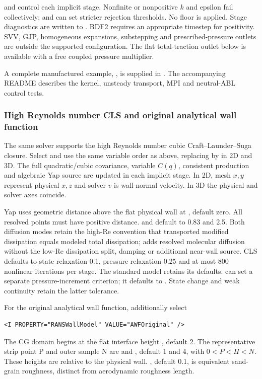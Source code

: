  and  control each
implicit stage. Nonfinite or nonpositive $k$ and epsilon fail collectively;
 and  can set stricter rejection
thresholds. No floor is applied. Stage diagnostics are written to
. BDF2 requires an appropriate timestep for positivity.
SVV, GJP, homogeneous expansions, substepping and prescribed-pressure outlets
are outside the supported configuration. The flat total-traction outlet below
is available with a free coupled pressure multiplier.

A complete manufactured example, , is supplied in
.
The accompanying README describes the kernel, unsteady transport, MPI and
neutral-ABL control tests.

\subsubsection{High Reynolds number CLS and original analytical wall function}
\label{CLSRANSScheme}

The same solver supports the high Reynolds number cubic Craft--Launder--Suga
closure. Select  and use the same variable
order as above, replacing  by  in 2D and 3D.
The full quadratic/cubic covariance, variable $C(q)$, consistent production
and algebraic Yap source are updated in each implicit stage. In 2D, mesh
$x,y$ represent physical $x,z$ and solver $v$ is wall-normal velocity.
In 3D the physical and solver axes coincide.

Yap uses geometric distance above the flat physical wall at
, default zero. All resolved points must have positive
distance.  and  default to
0.83 and 2.5. Both diffusion modes retain the high-Re convention that
transported modified dissipation equals modeled total dissipation;
 adds resolved molecular diffusion without the low-Re
dissipation split, damping or additional near-wall source.
CLS defaults to state relaxation 0.1, pressure relaxation 0.25 and at most
800 nonlinear iterations per stage. The standard model retains its defaults.
 can set a separate pressure-increment criterion;
it defaults to . State change and weak continuity
retain the latter tolerance.

For the original analytical wall function, additionally select
\begin{lstlisting}[style=XmlStyle]
<I PROPERTY="RANSWallModel" VALUE="AWFOriginal" />
\end{lstlisting}
The CG domain begins at the flat interface height
, default 2. The representative strip point P and
outer sample N are  and ,
default 1 and 4, with $0<P<H<N$. These heights are relative to the physical
wall. , default 0.1, is equivalent sand-grain
roughness, distinct from aerodynamic roughness length.

